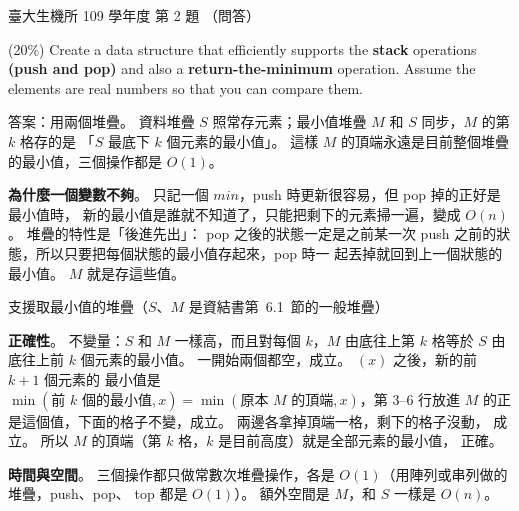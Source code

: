 \begin{pastexam}[label={px:ntu-109-bime-ds-02}]{臺大生機所 109 學年度 第 2 題}
（問答）

(20\%) Create a data structure that efficiently supports the \textbf{stack} operations
\textbf{(push and pop)} and also a \textbf{return-the-minimum} operation. Assume the elements are
real numbers so that you can compare them.
\end{pastexam}

\begin{pastsoln}
答案：用兩個堆疊。 資料堆疊 $S$ 照常存元素；最小值堆疊 $M$ 和 $S$ 同步，$M$ 的第 $k$ 格存的是
「$S$ 最底下 $k$ 個元素的最小值」。 這樣 $M$ 的頂端永遠是目前整個堆疊的最小值，三個操作都是
$O(1)$。

\textbf{為什麼一個變數不夠}。 只記一個 $\mathit{min}$，push 時更新很容易，但 pop 掉的正好是最小值時，
新的最小值是誰就不知道了，只能把剩下的元素掃一遍，變成 $O(n)$。 堆疊的特性是「後進先出」：
pop 之後的狀態一定是之前某一次 push 之前的狀態，所以只要把每個狀態的最小值存起來，pop 時一
起丟掉就回到上一個狀態的最小值。 $M$ 就是存這些值。

\begin{pseudo}{支援取最小值的堆疊（$S$、$M$ 是資結書第~6.1~節的一般堆疊）}
    \State {}
        \State {}
    \Else
        \State {} 
    \EndIf
\EndProcedure
\Statex
{}
        \State {}
    \EndIf
    \State {}
    \State \Return {}
\EndFunction
\Statex
{}
        \State {}
    \EndIf
    \State \Return {}
\EndFunction
\end{pseudo}

\textbf{正確性}。 不變量：$S$ 和 $M$ 一樣高，而且對每個 $k$，$M$ 由底往上第 $k$ 格等於 $S$ 由底往上前
$k$ 個元素的最小值。 一開始兩個都空，成立。 $(x)$ 之後，新的前 $k + 1$ 個元素的
最小值是 $\min(\text{前 } k \text{ 個的最小值}, x) = \min(\text{原本 } M \text{ 的頂端}, x)$，第 3--6 行放進
$M$ 的正是這個值，下面的格子不變，成立。  兩邊各拿掉頂端一格，剩下的格子沒動，
成立。 所以 $M$ 的頂端（第 $k$ 格，$k$ 是目前高度）就是全部元素的最小值， 正確。

\textbf{時間與空間}。 三個操作都只做常數次堆疊操作，各是 $O(1)$（用陣列或串列做的堆疊，push、pop、
top 都是 $O(1)$）。 額外空間是 $M$，和 $S$ 一樣是 $O(n)$。


\end{pastsoln}

